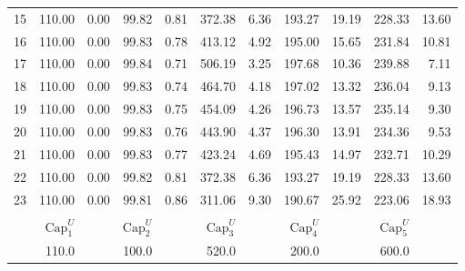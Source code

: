 \documentclass[12pt]{article}
\begin{document}
\begin{table}[h]
\begin{minipage}{\textwidth}
\begin{tabular}{crrrrrrrrrr}
15	&	110.00	&	0.00	&	99.82	&	0.81	&	372.38	&	6.36	&	193.27	&	19.19	&	228.33	&	13.60	\\
16	&	110.00	&	0.00	&	99.83	&	0.78	&	413.12	&	4.92	&	195.00	&	15.65	&	231.84	&	10.81	\\
17	&	110.00	&	0.00	&	99.84	&	0.71	&	506.19	&	3.25	&	197.68	&	10.36	&	239.88	&	7.11	\\
18	&	110.00	&	0.00	&	99.83	&	0.74	&	464.70	&	4.18	&	197.02	&	13.32	&	236.04	&	9.13	\\
19	&	110.00	&	0.00	&	99.83	&	0.75	&	454.09	&	4.26	&	196.73	&	13.57	&	235.14	&	9.30	\\
20	&	110.00	&	0.00	&	99.83	&	0.76	&	443.90	&	4.37	&	196.30	&	13.91	&	234.36	&	9.53	\\
21	&	110.00	&	0.00	&	99.83	&	0.77	&	423.24	&	4.69	&	195.43	&	14.97	&	232.71	&	10.29	\\
22	&	110.00	&	0.00	&	99.82	&	0.81	&	372.38	&	6.36	&	193.27	&	19.19	&	228.33	&	13.60	\\
23	&	110.00	&	0.00	&	99.81	&	0.86	&	311.06	&	9.30	&	190.67	&	25.92	&	223.06	&	18.93	\\

\hline \\[0.05ex]
& $\mbox{Cap}_1^U$ & & $\mbox{Cap}_2^U$ & & $\mbox{Cap}_3^U$ & & $\mbox{Cap}_4^U$ & & $\mbox{Cap}_5^U$ & \\
&	110.0	& &	100.0	& &	520.0	& &	200.0	& &	600.0	\\

\hline
\end{tabular}
\end{minipage}
\end{table}
\end{document}
